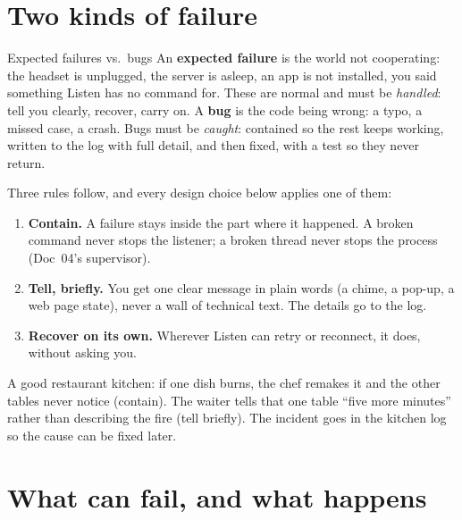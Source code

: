\documentclass[11pt,a4paper]{article}
\begin{document}
\section{Two kinds of failure}

\begin{concept}{Expected failures vs.\ bugs}
An \textbf{expected failure} is the world not cooperating: the headset is unplugged, the server
is asleep, an app is not installed, you said something Listen has no command for. These are
normal and must be \emph{handled}: tell you clearly, recover, carry on.
A \textbf{bug} is the code being wrong: a typo, a missed case, a crash. Bugs must be
\emph{caught}: contained so the rest keeps working, written to the log with full detail, and
then fixed, with a test so they never return.
\end{concept}

\noindent Three rules follow, and every design choice below applies one of them:
\begin{enumerate}[nosep]
  \item \textbf{Contain.} A failure stays inside the part where it happened. A broken command
        never stops the listener; a broken thread never stops the process (Doc~04's supervisor).
  \item \textbf{Tell, briefly.} You get one clear message in plain words (a chime, a pop-up, a
        web page state), never a wall of technical text. The details go to the log.
  \item \textbf{Recover on its own.} Wherever Listen can retry or reconnect, it does, without
        asking you.
\end{enumerate}

\begin{analogy}
A good restaurant kitchen: if one dish burns, the chef remakes it and the other tables never
notice (contain). The waiter tells that one table ``five more minutes'' rather than describing
the fire (tell briefly). The incident goes in the kitchen log so the cause can be fixed later.
\end{analogy}

\section{What can fail, and what happens}
\end{document}
